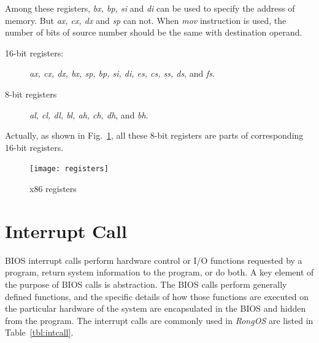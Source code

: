 \documentclass{swfcthesis}
\begin{document}
Among these registers, \emph{bx, bp, si} and \emph{di} can be used to specify the
address of memory. But \emph{ax, cx, dx} and \emph{sp} can not. When \emph{mov}
instruction is used, the number of bits of source number should be the same with
destination operand.

\begin{description}
\item[16-bit registers:] \emph{ax, cx, dx, bx, sp, bp, si, di, es, cs, ss, ds}, and \emph{fs}.
\item[8-bit registers] \emph{al, cl, dl, bl, ah, ch, dh}, and \emph{bh}.
\end{description}
Actually, as shown in Fig.~\ref{fig:regs}, all these 8-bit registers are parts of
corresponding 16-bit registers.

\begin{figure}[!htbp]
  \centering
  \begin{center}
    \texttt{[image: registers]}
  \end{center}
  \caption{x86 registers}
  \label{fig:regs}
\end{figure}

\section{Interrupt Call}

BIOS interrupt calls perform hardware control or I/O functions requested by a program,
return system information to the program, or do both. A key element of the purpose of BIOS
calls is abstraction. The BIOS calls perform generally defined functions, and the specific
details of how those functions are executed on the particular hardware of the system are
encapsulated in the BIOS and hidden from the program\cite{wiki:bios-int}. The interrupt
calls are commonly used in \emph{RongOS} are listed in Table~\ref{tbl:intcall}.
\end{document}

